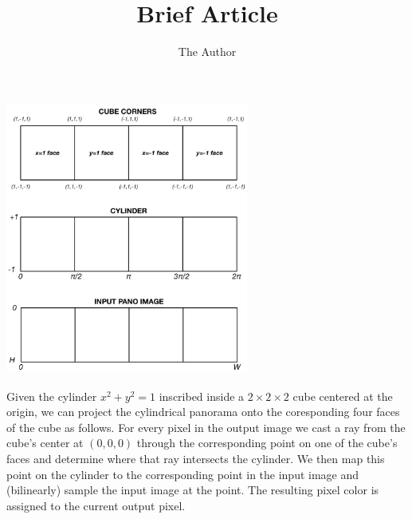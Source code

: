 \documentclass[11pt, oneside]{article}   	%
\title{Brief Article}
\author{The Author}
\begin{document}

\begin{center}
\includegraphics[width=0.6\textwidth]{cube_cylinder} 
\end{center}   
   
Given the cylinder $x^2 + y^2 = 1$ inscribed inside a $2 \times 2 \times 2$ cube
centered at the origin, we can project the cylindrical panorama onto the coresponding
four faces of the cube as follows.
For every pixel in the output image we cast a ray from the cube's center at $(0,0,0)$
through the corresponding point on one of the cube's faces and determine where that
ray intersects the cylinder. We then map this point on the cylinder to the corresponding
point in the input image and (bilinearly) sample the input image at the point. 
The resulting pixel color is assigned to the current output pixel.
\end{document}
